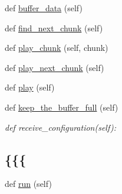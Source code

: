 \begin{DoxyCompactItemize}
\item 
def \hyperlink{classsrc_1_1core_1_1peer__ims_1_1Peer__IMS_a16ac77236618eefed91bccef8fa649b7}{buffer\+\_\+data} (self)
\item 
def \hyperlink{classsrc_1_1core_1_1peer__ims_1_1Peer__IMS_af7333f1126e87bf75e3a78c008b83097}{find\+\_\+next\+\_\+chunk} (self)
\item 
def \hyperlink{classsrc_1_1core_1_1peer__ims_1_1Peer__IMS_a18fc8211a694d8f4a827a2d9f5d17cae}{play\+\_\+chunk} (self, chunk)
\item 
def \hyperlink{classsrc_1_1core_1_1peer__ims_1_1Peer__IMS_a02867aca9091f129e3dea02e2c3fbff3}{play\+\_\+next\+\_\+chunk} (self)
\item 
def \hyperlink{classsrc_1_1core_1_1peer__ims_1_1Peer__IMS_a3dc2428cf6b96abfcda36b2e99a692bc}{play} (self)
\item 
def \hyperlink{classsrc_1_1core_1_1peer__ims_1_1Peer__IMS_a3ddd592cf7eafecde6cf83815295b84b}{keep\+\_\+the\+\_\+buffer\+\_\+full} (self)
\begin{DoxyCompactList}\small\item\em def receive\+\_\+configuration(self)\+: \subsection*{\{\{\{}\end{DoxyCompactList}\item 
def \hyperlink{classsrc_1_1core_1_1peer__ims_1_1Peer__IMS_a257ba1bbcfc1f440ca0df28b04b9be4f}{run} (self)
\end{DoxyCompactItemize}
